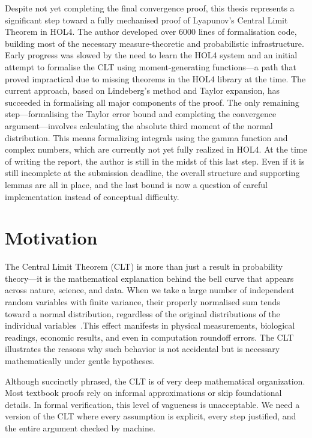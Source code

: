 Despite not yet completing the final convergence proof, this thesis represents a significant step toward a fully mechanised proof of Lyapunov’s Central Limit Theorem in HOL4. The author developed over 6000 lines of formalisation code, building most of the necessary measure-theoretic and probabilistic infrastructure. Early progress was slowed by the need to learn the HOL4 system and an initial attempt to formalise the CLT using moment-generating functions—a path that proved impractical due to missing theorems in the HOL4 library at the time. The current approach, based on Lindeberg's method and Taylor expansion, has succeeded in formalising all major components of the proof. The only remaining step—formalising the Taylor error bound  and completing the convergence argument—involves calculating the absolute third moment of the normal distribution. This means formalizing integrals using the gamma function and complex numbers, which are currently not yet fully realized in HOL4. At the time of writing the report, the author is still in the midst of this last step. Even if it is still incomplete at the submission deadline, the overall structure and supporting lemmas are all in place, and the last bound is now a question of careful implementation instead of conceptual difficulty.

\section{Motivation}
The Central Limit Theorem (CLT) is more than just a result in probability theory—it is the mathematical explanation behind the bell curve that appears across nature, science, and data. When we take a large number of independent random variables with finite variance, their properly normalised sum tends toward a normal distribution, regardless of the original distributions of the individual variables~\cite{fischer2011history}.This effect manifests in physical measurements, biological readings, economic results, and even in computation roundoff errors. The CLT illustrates the reasons why such behavior is not accidental but is necessary mathematically under gentle hypotheses.

Although succinctly phrased, the CLT is of very deep mathematical organization. Most textbook proofs rely on informal approximations or skip foundational details. In formal verification, this level of vagueness is unacceptable. We need a version of the CLT where every assumption is explicit, every step justified, and the entire argument checked by machine.

